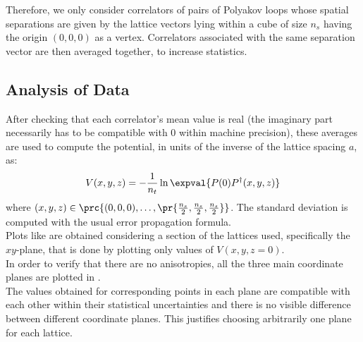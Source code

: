 Therefore, we only consider correlators of pairs of Polyakov loops whose spatial separations are given by the lattice vectors lying within a cube of size $n_s$ having the origin $(0,0,0)$ as a vertex.
Correlators associated with the same separation vector are then averaged together, to increase statistics.

\subsection{Analysis of Data}
After checking that each correlator's mean value is real (the imaginary part necessarily has to be compatible with $0$ within machine precision), these averages are used to compute the potential, in units of the inverse of the lattice spacing $a$, as:
\begin{equation}
    V(x,y,z) = -\frac{1}{n_t}\ln\expval{P(0)P^\dagger(x,y,z)} \label{4:Potential}
\end{equation}
where $(x,y,z)\in\prc{(0,0,0),\dots,\pr{\frac{n_s}{2},\frac{n_s}{2},\frac{n_s}{2}}}$.
The standard deviation is computed with the usual error propagation formula.\\
Plots like  are obtained considering a section of the lattices used, specifically the $xy$-plane, that is done by plotting only values of $V(x,y,z=0)$.\\
In order to verify that there are no anisotropies, all the three main coordinate planes are plotted in .\\
The values obtained for corresponding points in each plane are compatible with each other within their statistical uncertainties and there is no visible difference between different coordinate planes.
This justifies choosing arbitrarily one plane for each lattice.
